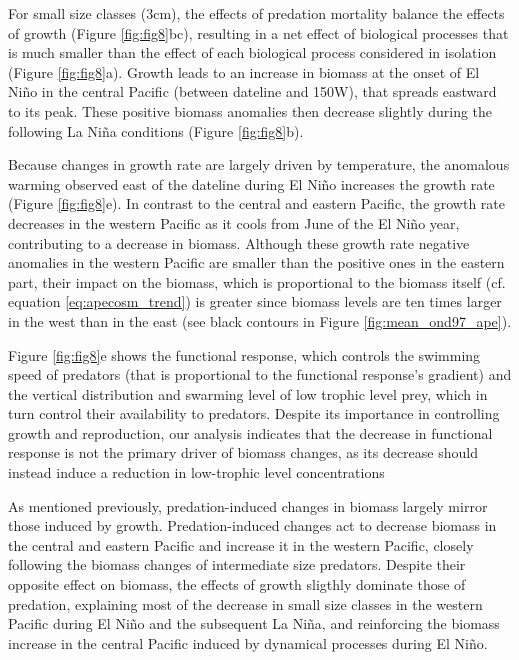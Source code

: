 For small size classes (3cm), the effects of predation mortality balance the effects of growth (Figure \ref{fig:fig8}bc), resulting in a net effect of biological processes that is much smaller than the effect of each biological process considered in isolation (Figure \ref{fig:fig8}a). Growth leads to an increase in biomass at the onset of El Niño in the central Pacific (between dateline and 150\degree{}W), that spreads eastward to its peak. These positive biomass anomalies then decrease slightly during the following La Niña conditions (Figure \ref{fig:fig8}b).

Because changes in growth rate are largely driven by temperature, the anomalous warming observed east of the dateline during El Niño increases the growth rate (Figure \ref{fig:fig8}e). In contrast to the central and eastern Pacific, the growth rate decreases in the western Pacific as it cools from June of the El Niño year, contributing to a decrease in biomass. Although these growth rate negative anomalies in the western Pacific are smaller than the positive ones in the eastern part, their impact on the biomass, which is proportional to the biomass itself (cf. equation \ref{eq:apecosm_trend}) is greater since biomass levels are ten times larger in the west than in the east (see black contours in Figure \ref{fig:mean_ond97_ape}).

Figure \ref{fig:fig8}e shows the functional response, which controls the swimming speed of predators (that is proportional to the functional response's gradient) and the vertical distribution and swarming level of low trophic level prey, which in turn control their availability to predators.  Despite its importance in controlling growth and reproduction, our analysis indicates that the decrease in functional response is not the primary driver of biomass changes, as its decrease should instead induce a reduction in low-trophic level concentrations 

As mentioned previously, predation-induced changes in biomass largely mirror those induced by growth. Predation-induced changes act to decrease biomass in the central and eastern Pacific and increase it in the western Pacific, closely following the biomass changes of intermediate size predators. Despite their opposite effect on biomass, the effects of growth sligthly dominate those of predation, explaining most of the decrease in small size classes in the western Pacific during El Niño and the subsequent La Niña, and reinforcing the biomass increase in the central Pacific induced by dynamical processes during El Niño.

